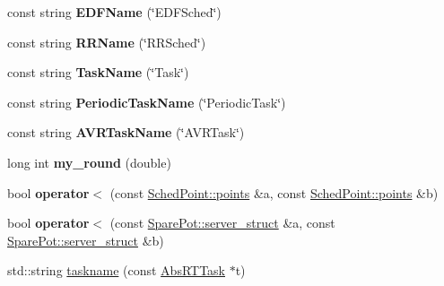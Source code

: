 \begin{DoxyCompactItemize}
\item 
const string {\bfseries E\+D\+F\+Name} (\char`\"{}E\+D\+F\+Sched\char`\"{})\hypertarget{namespaceRTSim_a359f04b07189fa46dd7cf0fcf2f0d599}{}\label{namespaceRTSim_a359f04b07189fa46dd7cf0fcf2f0d599}

\item 
const string {\bfseries R\+R\+Name} (\char`\"{}R\+R\+Sched\char`\"{})\hypertarget{namespaceRTSim_ac51b8d79ac34470950ed48a56c2194f1}{}\label{namespaceRTSim_ac51b8d79ac34470950ed48a56c2194f1}

\item 
const string {\bfseries Task\+Name} (\char`\"{}Task\char`\"{})\hypertarget{namespaceRTSim_ad49e65a9c1b925d6a5f0111fbf3d6d0b}{}\label{namespaceRTSim_ad49e65a9c1b925d6a5f0111fbf3d6d0b}

\item 
const string {\bfseries Periodic\+Task\+Name} (\char`\"{}Periodic\+Task\char`\"{})\hypertarget{namespaceRTSim_a95e467ae9609479ee12e71dab68888c7}{}\label{namespaceRTSim_a95e467ae9609479ee12e71dab68888c7}

\item 
const string {\bfseries A\+V\+R\+Task\+Name} (\char`\"{}A\+V\+R\+Task\char`\"{})\hypertarget{namespaceRTSim_a7bceb8e0add17794e58464ebac235a4f}{}\label{namespaceRTSim_a7bceb8e0add17794e58464ebac235a4f}

\item 
long int {\bfseries my\+\_\+round} (double)\hypertarget{namespaceRTSim_a0e5be6614134f0348144887378ec6b4c}{}\label{namespaceRTSim_a0e5be6614134f0348144887378ec6b4c}

\item 
bool {\bfseries operator$<$} (const \hyperlink{structRTSim_1_1SchedPoint_1_1points}{Sched\+Point\+::points} \&a, const \hyperlink{structRTSim_1_1SchedPoint_1_1points}{Sched\+Point\+::points} \&b)\hypertarget{namespaceRTSim_adc5f508b711cb81cd0409eba194fc172}{}\label{namespaceRTSim_adc5f508b711cb81cd0409eba194fc172}

\item 
bool {\bfseries operator$<$} (const \hyperlink{structRTSim_1_1SparePot_1_1server__struct}{Spare\+Pot\+::server\+\_\+struct} \&a, const \hyperlink{structRTSim_1_1SparePot_1_1server__struct}{Spare\+Pot\+::server\+\_\+struct} \&b)\hypertarget{namespaceRTSim_a4541a545883a4c93d1417c1a67d282a8}{}\label{namespaceRTSim_a4541a545883a4c93d1417c1a67d282a8}

\item 
std\+::string \hyperlink{namespaceRTSim_abc83f9022338e1d635cdc2a285a4ff23}{taskname} (const \hyperlink{classRTSim_1_1AbsRTTask}{Abs\+R\+T\+Task} $\ast$t)
\end{DoxyCompactItemize}

